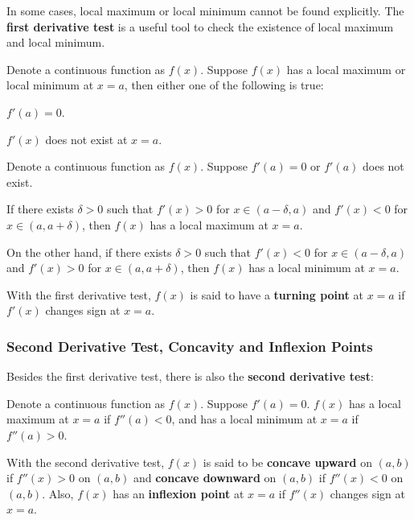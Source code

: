 \documentclass[a4paper,12pt]{article}
\begin{document}
In some cases, local maximum or local minimum cannot be found explicitly. The \textbf{first derivative test} is a useful tool to check the existence of local maximum and local minimum.\n

\begin{pst}
  Denote a continuous function as $f(x)$. Suppose $f(x)$ has a local maximum or local minimum at $x=a$, then either one of the following is true:

  \begin{alist}
    \item $f'(a)=0$.

    \item $f'(x)$ does not exist at $x=a$.
  \end{alist}
\end{pst}\n

\begin{pst}
  Denote a continuous function as $f(x)$. Suppose $f'(a)=0$ or $f'(a)$ does not exist.\n

   If there exists $\delta>0$ such that $f'(x)>0$ for $x\in(a-\delta,a)$ and $f'(x)<0$ for $x\in(a,a+\delta)$, then $f(x)$ has a local maximum at $x=a$.\n

   On the other hand, if there exists $\delta>0$ such that $f'(x)<0$ for $x\in(a-\delta,a)$ and $f'(x)>0$ for $x\in(a,a+\delta)$, then $f(x)$ has a local minimum at $x=a$.
\end{pst}\n

\begin{dft}
  With the first derivative test, $f(x)$ is said to have a \textbf{turning point} at $x=a$ if $f'(x)$ changes sign at $x=a$.
\end{dft}

\subsubsection{Second Derivative Test, Concavity and Inflexion Points}
Besides the first derivative test, there is also the \textbf{second derivative test}:\n

\begin{pst}
  Denote a continuous function as $f(x)$. Suppose $f'(a)=0$. $f(x)$ has a local maximum at $x=a$ if $f''(a)<0$, and has a local minimum at $x=a$ if $f''(a)>0$.
\end{pst}\n

\begin{dft}
  With the second derivative test, $f(x)$ is said to be \textbf{concave upward} on $(a,b)$ if $f''(x)>0$ on $(a,b)$ and \textbf{concave downward} on $(a,b)$ if $f''(x)<0$ on $(a,b)$. Also, $f(x)$ has an \textbf{inflexion point} at $x=a$ if $f''(x)$ changes sign at $x=a$.
\end{dft}
\end{document}
